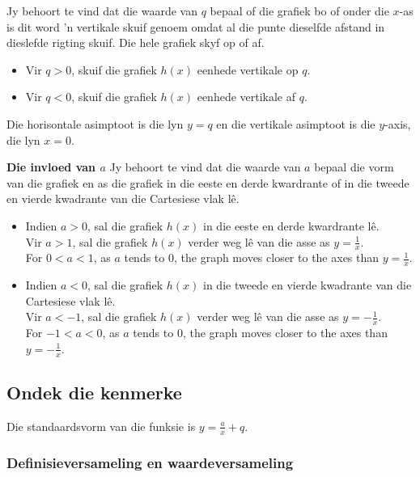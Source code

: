 Jy behoort te vind dat die waarde van $q$ bepaal of die grafiek bo of onder die $x$-as is dit word 'n vertikale skuif genoem omdat al die punte dieselfde afstand in dieslefde rigting skuif. Die hele grafiek skyf op of af.  
\begin{itemize}
\item Vir $q>0$, skuif die grafiek $h(x)$ eenhede vertikale op $q$. 
\item Vir $q<0$, skuif die grafiek $h(x)$ eenhede vertikale af $q$.
\end{itemize}
Die horisontale asimptoot is die lyn $y=q$ en die vertikale asimptoot is die $y$-axis, die lyn $x=0$.\par
\vspace{8pt}
\textbf{Die invloed van $a$}\newline
Jy behoort te vind dat die waarde van $a$ bepaal die vorm van die grafiek  en as die grafiek in die eeste en derde kwardrante of in die tweede
en vierde kwadrante van die Cartesiese vlak lê. 
\begin{itemize}
 \item Indien $a>0$, sal die grafiek $h(x)$ in die eeste en derde kwardrante lê. \\
Vir $a>1$, sal die grafiek $h(x)$ verder weg l\^e van die asse as $y=\frac{1}{x}$.
\\For $0<a<1$, as $a$ tends to $0$, the graph moves closer to the axes than $y=\frac{1}{x}$. 
\item Indien $a<0$, sal die grafiek $h(x)$ in die tweede
en vierde kwadrante van die Cartesiese vlak lê.\\
Vir $a<-1$, sal die grafiek $h(x)$ verder weg l\^e van die asse as $y=-\frac{1}{x}$.
\\For $-1<a<0$, as $a$ tends to $0$, the graph moves closer to the axes than $y=-\frac{1}{x}$. 
\end{itemize}



\subsection*{Ondek die kenmerke}  
Die standaardsvorm van die funksie is $y=\frac{a}{x}+q$.

\subsubsection*{Definisieversameling en waardeversameling}

